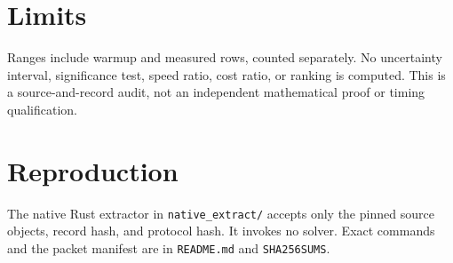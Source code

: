 \documentclass[10pt]{article}
\begin{document}
\section*{Limits}
Ranges include warmup and measured rows, counted separately. No uncertainty interval, significance test, speed ratio, cost ratio, or ranking is computed. This is a source-and-record audit, not an independent mathematical proof or timing qualification.
\section*{Reproduction}
The native Rust extractor in \texttt{native\_extract/} accepts only the pinned source objects, record hash, and protocol hash. It invokes no solver. Exact commands and the packet manifest are in \texttt{README.md} and \texttt{SHA256SUMS}.
\end{document}

